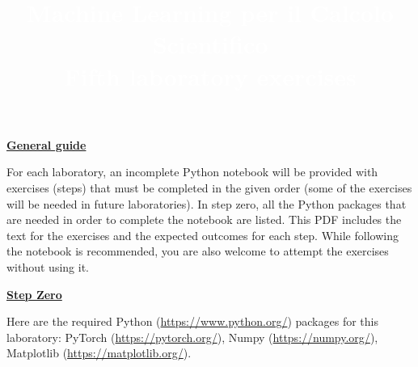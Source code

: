 \documentclass{article}
\title{\textcolor{white}{\textbf{Machine Learning per il Calcolo Scientifico}\\ \small\textbf{Fifth laboratory exercises }}}
\date{}
\newcommand{\step}[1]{\underline{\textbf{\large{#1}}} }
\begin{document}
\AddToShipoutPicture*
{%
  \AtPageUpperLeft
  {%
    \color{bluunipv}%
    \raisebox{-.1\paperheight}{\rule{\paperwidth}{.5\paperheight}}%

  }%
}

\maketitle

\begin{center}\step{General guide} \end{center}
\noindent
For each laboratory, an incomplete Python notebook will be provided with exercises (steps) that must be completed in the given order (some of the exercises will be needed in future laboratories). In step zero, all the Python packages that are needed in order to complete the notebook are listed. This PDF includes the text for the exercises and the expected outcomes for each step. While following the notebook is recommended, you are also welcome to attempt the exercises without using it.

\begin{center}\step{Step Zero} \end{center}
\noindent
Here are the required Python (\url{https://www.python.org/}) packages for this laboratory: PyTorch (\url{https://pytorch.org/}), Numpy (\url{https://numpy.org/}), Matplotlib (\url{https://matplotlib.org/}).
\end{document}
